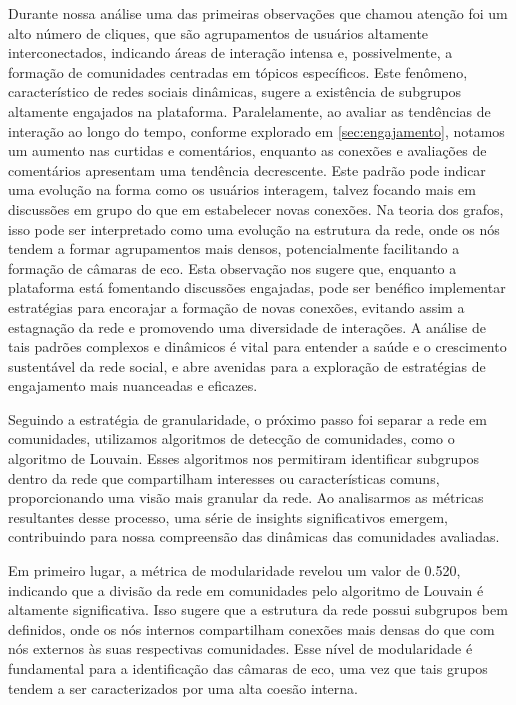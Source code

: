 Durante nossa análise uma das primeiras observações que chamou atenção foi um alto número de cliques, que são agrupamentos de usuários altamente interconectados, indicando áreas de interação intensa e, possivelmente, a formação de comunidades centradas em tópicos específicos. Este fenômeno, característico de redes sociais dinâmicas, sugere a existência de subgrupos altamente engajados na plataforma. Paralelamente, ao avaliar as tendências de interação ao longo do tempo, conforme explorado em \autoref{sec:engajamento}, notamos um aumento nas curtidas e comentários, enquanto as conexões e avaliações de comentários apresentam uma tendência decrescente. Este padrão pode indicar uma evolução na forma como os usuários interagem, talvez focando mais em discussões em grupo do que em estabelecer novas conexões. Na teoria dos grafos, isso pode ser interpretado como uma evolução na estrutura da rede, onde os nós tendem a formar agrupamentos mais densos, potencialmente facilitando a formação de câmaras de eco. Esta observação nos sugere que, enquanto a plataforma está fomentando discussões engajadas, pode ser benéfico implementar estratégias para encorajar a formação de novas conexões, evitando assim a estagnação da rede e promovendo uma diversidade de interações. A análise de tais padrões complexos e dinâmicos é vital para entender a saúde e o crescimento sustentável da rede social, e abre avenidas para a exploração de estratégias de engajamento mais nuanceadas e eficazes.

Seguindo a estratégia de granularidade, o próximo passo foi separar a rede em comunidades, utilizamos algoritmos de detecção de comunidades, como o algoritmo de Louvain. Esses algoritmos nos permitiram identificar subgrupos dentro da rede que compartilham interesses ou características comuns, proporcionando uma visão mais granular da rede. Ao analisarmos as métricas resultantes desse processo, uma série de insights significativos emergem, contribuindo para nossa compreensão das dinâmicas das comunidades avaliadas.

Em primeiro lugar, a métrica de modularidade revelou um valor de 0.520, indicando que a divisão da rede em comunidades pelo algoritmo de Louvain é altamente significativa. Isso sugere que a estrutura da rede possui subgrupos bem definidos, onde os nós internos compartilham conexões mais densas do que com nós externos às suas respectivas comunidades. Esse nível de modularidade é fundamental para a identificação das câmaras de eco, uma vez que tais grupos tendem a ser caracterizados por uma alta coesão interna.

